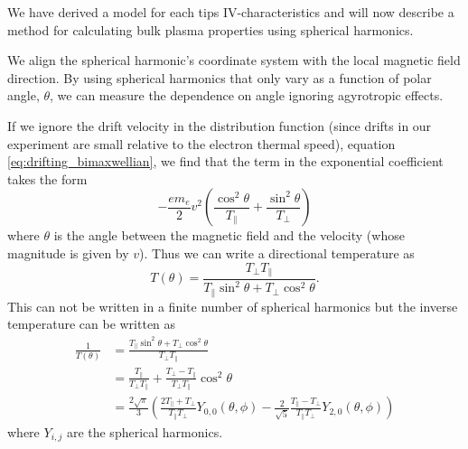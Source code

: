 
We have derived a model for each tips IV-characteristics and will now describe a method for calculating bulk plasma properties using spherical harmonics.


We align the spherical harmonic's coordinate system with the local magnetic field direction. By using spherical harmonics that only vary as a function of polar angle, $\theta$, we can measure the dependence on angle ignoring agyrotropic effects.


If we ignore the drift velocity in the distribution function (since drifts in our experiment are small relative to the electron thermal speed), equation \ref{eq:drifting_bimaxwellian}, we find that the term in the exponential coefficient takes the form
\begin{equation}
    -\frac{e m_e}{2} v^2 \left(\frac{\cos^2\theta}{T_\parallel} + \frac{\sin^2\theta}{T_\perp}\right)
\end{equation}
where $\theta$ is the angle between the magnetic field and the velocity (whose magnitude is given by $v$). Thus we can write a directional temperature as
\begin{equation}
    T(\theta) = \frac{T_\perp T_\parallel}{T_\parallel \sin^2 \theta + T_\perp \cos^2 \theta}.
    \label{eq:pa_directional_temperature}
\end{equation}
This can not be written in a finite number of spherical harmonics but the inverse temperature can be written as
\begin{align}
    \frac{1}{T(\theta)} &= \frac{T_\parallel \sin^2 \theta + T_\perp \cos^2 \theta}{T_\perp T_\parallel} \\
    &= \frac{T_\parallel}{T_\perp T_\parallel} + \frac{T_\perp - T_\parallel}{T_\perp T_\parallel} \cos^2\theta \\
    &= \frac{2 \sqrt{\pi}}{3} \left(\frac{2 T_\parallel + T_\perp}{T_\parallel T_\perp} Y_{0,0}(\theta, \phi) - \frac{2}{\sqrt{5}} \frac{T_\parallel - T_\perp}{T_\parallel T_\perp} Y_{2, 0}(\theta, \phi)\right) \label{eq:pa_bimax_inv_temp}
\end{align}
where $Y_{i,j}$ are the spherical harmonics.

